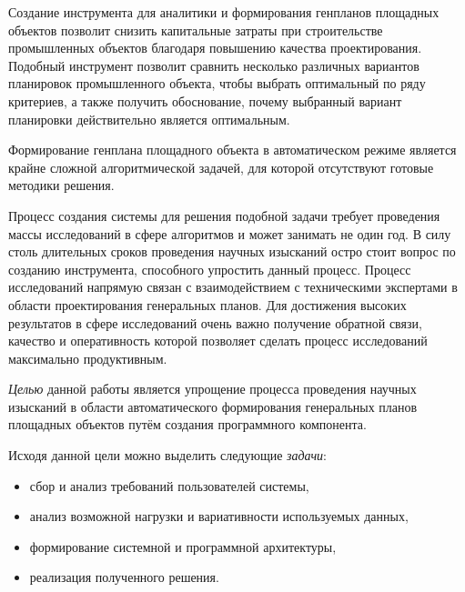 Создание инструмента для аналитики и формирования генпланов площадных объектов позволит снизить
капитальные затраты при строительстве промышленных объектов благодаря повышению качества проектирования.
Подобный инструмент позволит сравнить несколько различных вариантов планировок промышленного объекта,
чтобы выбрать оптимальный по ряду критериев, а также получить обоснование,
почему выбранный вариант планировки действительно является оптимальным.

Формирование генплана площадного объекта в автоматическом режиме
является крайне сложной алгоритмической задачей, для которой отсутствуют готовые методики решения.

Процесс создания системы для решения подобной задачи требует
проведения массы исследований в сфере алгоритмов и может занимать не один год.
В силу столь длительных сроков проведения научных изысканий остро стоит вопрос по созданию инструмента,
способного упростить данный процесс.
Процесс исследований напрямую связан с взаимодействием с техническими экспертами
в области проектирования генеральных планов.
Для достижения высоких результатов в сфере исследований очень важно получение обратной связи,
качество и оперативность которой позволяет сделать процесс исследований максимально продуктивным.

\textit{Целью} данной работы является
упрощение процесса проведения научных изысканий
в области автоматического формирования генеральных планов площадных объектов
путём создания программного компонента.

Исходя данной цели можно выделить следующие \textit{задачи}:
\begin{itemize}
    \item сбор и анализ требований пользователей системы,
    \item анализ возможной нагрузки и вариативности используемых данных,
    \item формирование системной и программной архитектуры,
    \item реализация полученного решения.
\end{itemize}
